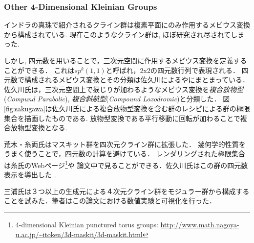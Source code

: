 \subsubsection{Other 4-Dimensional Kleinian Groups}

インドラの真珠で紹介されるクライン群は複素平面にのみ作用するメビウス変換から構成されている.
現在このようなクライン群は, ほぼ研究され尽されてしまった.

しかし, 四元数を用いることで，三次元空間に作用するメビウス変換を定義することができる．
これは$sp^k(1, 1)$と呼ばれ，2x2の四元数行列で表現される．
四元数で構成されるメビウス変換とその分類は佐久川による\cite{sakugawaMaster}や\cite{accidentalParabolic}にまとまっている．佐久川氏は，三次元空間上で捩じりが加わるようなメビウス変換を\emph{複合放物型}({\it Compund Parabolic}), \emph{複合斜航型}({\it Compound Loxodromic})と分類した．
図\ref{fig:sakugawa}は佐久川氏による複合放物型変換を含む群のレシピによる群の極限集合を描画したものである.
放物型変換である平行移動に回転が加わることで複合放物型変換となる.

荒木・糸両氏はマスキット群を四次元クライン群に拡張した\cite{maskit}．
幾何学的性質をうまく使うことで，四元数の計算を避けている．
レンダリングされた極限集合は糸氏のWebページ\footnote{4-dimensional
Kleinian punctured torus groups:
\url{http://www.math.nagoya-u.ac.jp/~itoken/3d-maskit/3d-maskit.html}}や
論文中で見ることができる．佐久川氏はこの群の四元数表示を導出した
\cite{sakugawa4d}.

三浦氏は３つ以上の生成元による４次元クライン群をモジュラー群から構成することを試みた\cite{miura}．筆者はこの論文における数値実験と可視化を行った．

